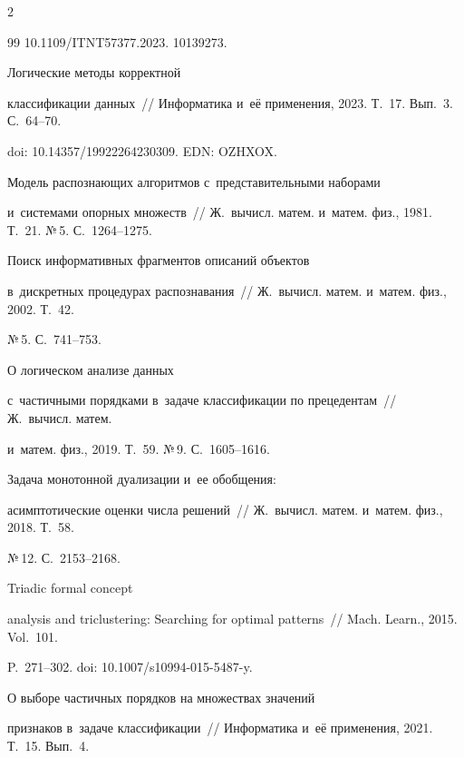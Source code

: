 \begin{multicols}{2}
{{\begin{thebibliography}{99}
10.1109/ITNT57377.2023. 10139273. 




 Логические методы корректной 


классификации данных~// Информатика и~её применения, 2023. Т.~17. Вып.~3. С.~64--70. 


doi: 10.14357/19922264230309. EDN: \mbox{OZHXOX}.




 Модель распознающих алгоритмов с~представительными наборами 


и~сис\-те\-ма\-ми опорных множеств~// Ж.~вычисл. матем. и~матем. физ., 1981. Т.~21. №\,5. С.~1264--1275. 




 Поиск информативных фрагментов описаний объектов 


в~дискретных процедурах распознавания~// Ж.~вычисл. матем. и~матем. физ., 2002. Т.~42. 


№\,5. С.~741--753. 




 О логическом анализе данных 


с~час\-тич\-ны\-ми порядками в~задаче классификации по прецедентам~// Ж.~вычисл. матем. 


и~матем. физ., 2019. Т.~59. №\,9. С.~1605--1616.




 Задача монотонной дуализации и~ее обобщения: 


асимптотические оценки числа решений~// Ж.~вычисл. матем. и~матем. физ., 2018. Т.~58. 


№\,12. С.~2153--2168.




 Triadic formal concept 


analysis and triclustering: Searching for optimal patterns~// Mach. Learn., 2015. Vol.~101. 


P.~271--302.  doi: 10.1007/s10994-015-5487-y.




 О выборе частичных порядков на множествах значений 


признаков в~задаче классификации~// Информатика и~её применения, 2021. Т.~15. Вып.~4. 



\end{thebibliography}}}
\end{multicols}
